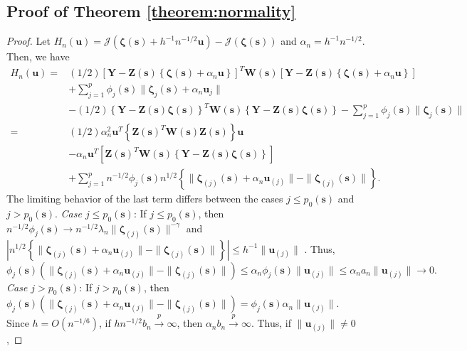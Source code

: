 \documentclass[authoryear,review, 12pt]{elsarticle}
\begin{document}
\subsection*{Proof of Theorem \ref{theorem:normality}\label{sec:gaussian-normality-proof} }
\begin{proof}
Let $H_{n}(\bm{u})=\mathcal{J}\left(\bm{\zeta}(\bm{s})+h^{-1}n^{-1/2}\bm{u}\right)-\mathcal{J}\left(\bm{\zeta}(\bm{s})\right)$
and $\alpha_{n}=h^{-1}n^{-1/2}$. Then, we have 
\begin{align*}
H_{n}(\bm{u})= & (1/2)\left[\bm{Y}-\bm{Z}(\bm{s})\left\{ \bm{\zeta}(\bm{s})+\alpha_{n}\bm{u}\right\} \right]^{T}\bm{W}\!(\bm{s})\left[\bm{Y}-\bm{Z}(\bm{s})\left\{ \bm{\zeta}(\bm{s})+\alpha_{n}\bm{u}\right\} \right]\\
 & +\sum_{j=1}^{p}\phi_{j}(\bm{s})\|\bm{\zeta}_{j}(\bm{s})+\alpha_{n}\bm{u}_{j}\|\\
 & -(1/2)\left\{ \bm{Y}-\bm{Z}(\bm{s})\bm{\zeta}(\bm{s})\right\} ^{T}\bm{W}\!(\bm{s})\left\{ \bm{Y}-\bm{Z}(\bm{s})\bm{\zeta}(\bm{s})\right\} -\sum_{j=1}^{p}\phi_{j}(\bm{s})\|\bm{\zeta}_{j}(\bm{s})\|\\
= & \left(1/2\right)\alpha_{n}^{2}\bm{u}^{T}\left\{ \bm{Z}(\bm{s})^{T}\bm{W}\!(\bm{s})\bm{Z}(\bm{s})\right\} \bm{u}\\
 & -\alpha_{n}\bm{u}^{T}\left[\bm{Z}(\bm{s})^{T}\bm{W}\!(\bm{s})\left\{ \bm{Y}-\bm{Z}(\bm{s})\bm{\zeta}(\bm{s})\right\} \right]\\
 & +\sum_{j=1}^{p}n^{-1/2}\phi_{j}(\bm{s})n^{1/2}\left\{ \|\bm{\zeta}_{(j)}(\bm{s})+\alpha_{n}\bm{u}_{(j)}\|-\|\bm{\zeta}_{(j)}(\bm{s})\|\right\} .
\end{align*}
The limiting behavior of the last term differs between the cases $j\le p_{0}(\bm{s})$
and $j>p_{0}(\bm{s})$.
\emph{Case $j\le p_{0}(\bm{s})$}: If $j\le p_{0}(\bm{s})$, then $n^{-1/2}\phi_{j}(\bm{s})\to n^{-1/2}\lambda_{n}\|\bm{\zeta}_{(j)}(\bm{s})\|^{-\gamma}$
and $|n^{1/2}\left\{ \|\bm{\zeta}_{(j)}(\bm{s})+\alpha_{n}\bm{u}_{(j)}\|-\|\bm{\zeta}_{(j)}(\bm{s})\|\right\} |\le h^{-1}\|\bm{u}_{(j)}\|$
. Thus, 
\[
\phi_{j}(\bm{s})\left(\|\bm{\zeta}_{(j)}(\bm{s})+\alpha_{n}\bm{u}_{(j)}\|-\|\bm{\zeta}_{(j)}(\bm{s})\|\right)\le\alpha_{n}\phi_{j}(\bm{s})\|\bm{u}_{(j)}\|\le\alpha_{n}a_{n}\|\bm{u}_{(j)}\|\to0.
\]
\emph{Case $j>p_{0}(\bm{s})$}: If $j>p_{0}(\bm{s})$, then $\phi_{j}(\bm{s})\left(\|\bm{\zeta}_{(j)}(\bm{s})+\alpha_{n}\bm{u}_{(j)}\|-\|\bm{\zeta}_{(j)}(\bm{s})\|\right)=\phi_{j}(\bm{s})\alpha_{n}\|\bm{u}_{(j)}\|$.
Since $h=O(n^{-1/6})$, if $hn^{-1/2}b_{n}\xrightarrow{p}\infty$,
then $\alpha_{n}b_{n}\xrightarrow{p}\infty$. Thus, if $\|\bm{u}_{(j)}\|\ne0$,

\end{proof}
\end{document}
